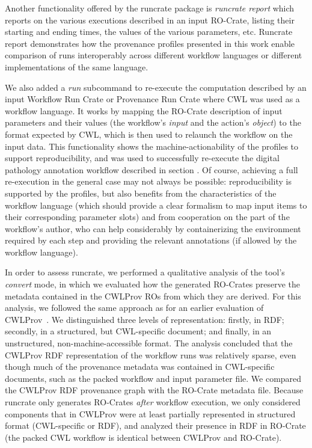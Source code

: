 \documentclass[10pt,letterpaper]{article}
\begin{document}
Another functionality offered by the runcrate package is \emph{runcrate report} which reports on the various executions described in an input RO-Crate, listing their starting and ending times, the values of the various parameters, etc.
Runcrate report demonstrates how the provenance profiles presented in this work enable comparison of runs interoperably across different workflow languages or different implementations of the same language.

We also added a \emph{run} subcommand to re-execute the computation described by an input Workflow Run Crate or Provenance Run Crate where CWL was used as a workflow language.
It works by mapping the RO-Crate description of input parameters and their values (the workflow's
\emph{input} and the action's \emph{object}) to the format expected by CWL, which is then used to relaunch the workflow on the input data.
This functionality shows the machine-actionability of the profiles to support reproducibility, and was used to successfully re-execute the digital pathology annotation workflow described in section .
Of course, achieving a full re-execution in the general case may not always be possible: reproducibility is supported by the profiles, but also benefits from the characteristics of the workflow language (which should provide a clear formalism to map input items to their corresponding parameter slots) and from cooperation on the part of the workflow's author, who can help considerably by containerizing the environment required by each step and providing the relevant annotations (if allowed by the workflow language).

In order to assess runcrate, we performed a qualitative analysis of the tool's \emph{convert} mode, in which we evaluated how the generated RO-Crates preserve the metadata contained in the CWLProv ROs from which they are derived.
For this analysis, we followed the same approach as for an earlier evaluation of CWLProv~\cite{De Wit 2022}.
We distinguished three levels of representation:
firstly, in RDF; secondly, in a structured, but CWL-specific document;
and finally, in an unstructured, non-machine-accessible format.
The analysis concluded that the CWLProv RDF representation of the workflow runs was relatively sparse, even though much of the provenance metadata was contained in CWL-specific documents, such as the packed workflow and input parameter file.
We compared the CWLProv RDF provenance graph with the RO-Crate metadata file.
Because runcrate only generates RO-Crates \emph{after} workflow execution, we only considered components that in CWLProv were at least partially represented in structured format (CWL-specific or RDF), and analyzed their presence in RDF in RO-Crate (the packed CWL workflow is identical between CWLProv and RO-Crate).
\end{document}
